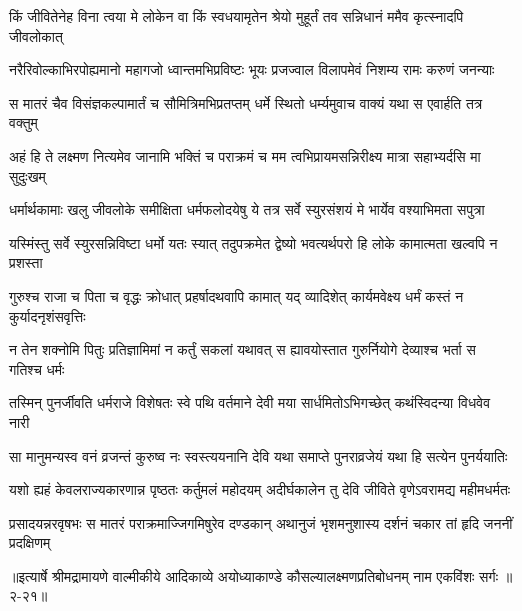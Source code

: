 \twolineshloka
{किं जीवितेनेह विना त्वया मे लोकेन वा किं स्वधयामृतेन}
{श्रेयो मुहूर्तं तव सन्निधानं ममैव कृत्स्नादपि जीवलोकात्} %

\twolineshloka
{नरैरिवोल्काभिरपोह्यमानो महागजो ध्वान्तमभिप्रविष्टः}
{भूयः प्रजज्वाल विलापमेवं निशम्य रामः करुणं जनन्याः} %

\twolineshloka
{स मातरं चैव विसंज्ञकल्पामार्तं च सौमित्रिमभिप्रतप्तम्}
{धर्मे स्थितो धर्म्यमुवाच वाक्यं यथा स एवार्हति तत्र वक्तुम्} %

\twolineshloka
{अहं हि ते लक्ष्मण नित्यमेव जानामि भक्तिं च पराक्रमं च}
{मम त्वभिप्रायमसन्निरीक्ष्य मात्रा सहाभ्यर्दसि मा सुदुःखम्} %

\twolineshloka
{धर्मार्थकामाः खलु जीवलोके समीक्षिता धर्मफलोदयेषु}
{ये तत्र सर्वे स्युरसंशयं मे भार्येव वश्याभिमता सपुत्रा} %

\twolineshloka
{यस्मिंस्तु सर्वे स्युरसन्निविष्टा धर्मो यतः स्यात् तदुपक्रमेत}
{द्वेष्यो भवत्यर्थपरो हि लोके कामात्मता खल्वपि न प्रशस्ता} %

\twolineshloka
{गुरुश्च राजा च पिता च वृद्धः क्रोधात् प्रहर्षादथवापि कामात्}
{यद् व्यादिशेत् कार्यमवेक्ष्य धर्मं कस्तं न कुर्यादनृशंसवृत्तिः} %

\twolineshloka
{न तेन शक्नोमि पितुः प्रतिज्ञामिमां न कर्तुं सकलां यथावत्}
{स ह्यावयोस्तात गुरुर्नियोगे देव्याश्च भर्ता स गतिश्च धर्मः} %

\twolineshloka
{तस्मिन् पुनर्जीवति धर्मराजे विशेषतः स्वे पथि वर्तमाने}
{देवी मया सार्धमितोऽभिगच्छेत् कथंस्विदन्या विधवेव नारी} %

\twolineshloka
{सा मानुमन्यस्व वनं व्रजन्तं कुरुष्व नः स्वस्त्ययनानि देवि}
{यथा समाप्ते पुनराव्रजेयं यथा हि सत्येन पुनर्ययातिः} %

\twolineshloka
{यशो ह्यहं केवलराज्यकारणान्न पृष्ठतः कर्तुमलं महोदयम्}
{अदीर्घकालेन तु देवि जीविते वृणेऽवरामद्य महीमधर्मतः} %

\twolineshloka
{प्रसादयन्नरवृषभः स मातरं पराक्रमाज्जिगमिषुरेव दण्डकान्}
{अथानुजं भृशमनुशास्य दर्शनं चकार तां हृदि जननीं प्रदक्षिणम्} %


॥इत्यार्षे श्रीमद्रामायणे वाल्मीकीये आदिकाव्ये अयोध्याकाण्डे कौसल्यालक्ष्मणप्रतिबोधनम् नाम एकविंशः सर्गः ॥२-२१॥
